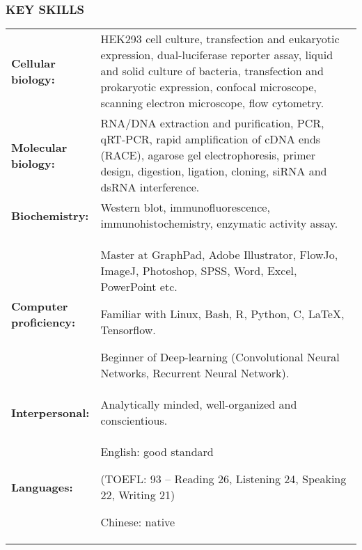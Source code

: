 \documentclass[12pt]{article}
\begin{document}
\subsubsection*{KEY SKILLS}\label{Key skills}
\renewcommand\arraystretch{1.5}\tabcolsep=0pt
\begin{longtable}{p{0.25\linewidth}p{0.75\linewidth}}
    \textbf{Cellular biology:} & HEK293 cell culture, transfection and eukaryotic expression, dual-luciferase reporter assay, liquid and solid culture of bacteria, transfection and prokaryotic expression, confocal microscope, scanning electron microscope, flow cytometry. \\
    
    \textbf{Molecular biology:} & RNA/DNA extraction and purification, PCR, qRT-PCR, rapid amplification of cDNA ends (RACE), agarose gel electrophoresis, primer design, digestion, ligation, cloning, siRNA and dsRNA interference. \\
    
    \textbf{Biochemistry:} & Western blot, immunofluorescence, immunohistochemistry, enzymatic activity assay. \\
    
    \textbf{Computer proficiency:} & Master at GraphPad, Adobe Illustrator, FlowJo, ImageJ, Photoshop, SPSS, Word, Excel, PowerPoint etc. 
    
                                     Familiar with Linux, Bash, R, Python, C, \LaTeX, Tensorflow. 
                                     
                                     Beginner of Deep-learning (Convolutional Neural Networks, Recurrent Neural Network). \\
    
    \textbf{Interpersonal:} & Analytically minded, well-organized and conscientious. \\
    
    \textbf{Languages:} & English: good standard
    
                          (TOEFL: 93 – Reading 26, Listening 24, Speaking 22, Writing 21)
    
                          Chinese: native\\
    
    
\end{longtable}

\vspace{0.5cm}

\end{document}

